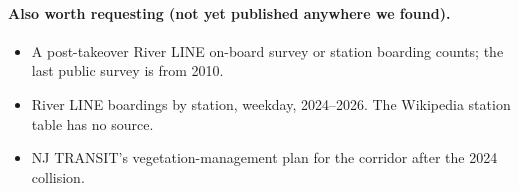 \documentclass[10.5pt]{article}
\begin{document}
\paragraph{Also worth requesting (not yet published anywhere we found).}
\begin{itemize}
\item A post-takeover River LINE on-board survey or station boarding counts; the last public survey is from 2010.
\item River LINE boardings by station, weekday, 2024--2026. The Wikipedia station table has no source.
\item NJ TRANSIT's vegetation-management plan for the corridor after the 2024 collision.
\end{itemize}
\end{document}
